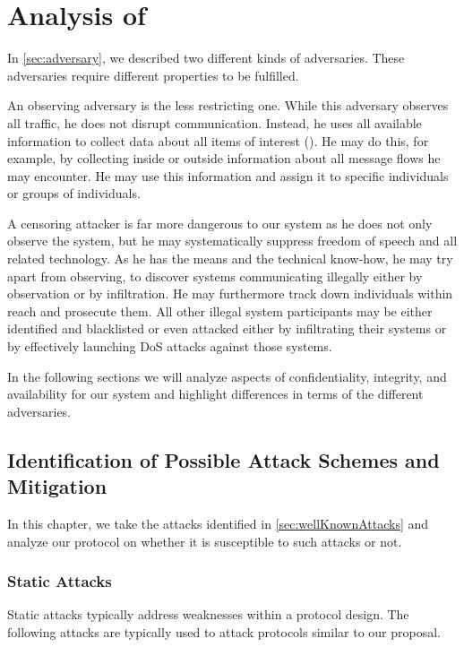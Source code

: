 \part{Analysis of \MessageVortex}\label{sec:analysis}
In \cref{sec:adversary}, we described two different kinds of adversaries. These adversaries require different properties to be fulfilled. 

An observing adversary is the less restricting one. While this adversary observes all traffic, he does not disrupt communication. Instead, he uses all available information to collect data about all items of interest (). He may do this, for example, by collecting inside or outside information about all message flows he may encounter. He may use this information and assign it to specific individuals or groups of individuals.

A censoring attacker is far more dangerous to our system as he does not only observe the system, but he may systematically suppress freedom of speech and all related technology. As he has the means and the technical know-how, he may try apart from observing, to discover systems communicating illegally either by observation or by infiltration. He may furthermore track down individuals within reach and prosecute them. All other illegal system participants may be either identified and blacklisted or even attacked either by infiltrating their systems or by effectively launching DoS attacks against those systems.

In the following sections we will analyze aspects of confidentiality, integrity, and availability for our system and highlight differences in terms of the different adversaries.

\chapter[Identification of Attacks and Mitigations]{Identification of Possible Attack Schemes and Mitigation}\label{sec:attacks}
In this chapter, we take the attacks identified in \cref{sec:wellKnownAttacks} and analyze our protocol on whether it is susceptible to such attacks or not.

\section{Static Attacks}
Static attacks typically address weaknesses within a protocol design. The following attacks are typically used to attack protocols similar to our proposal.

